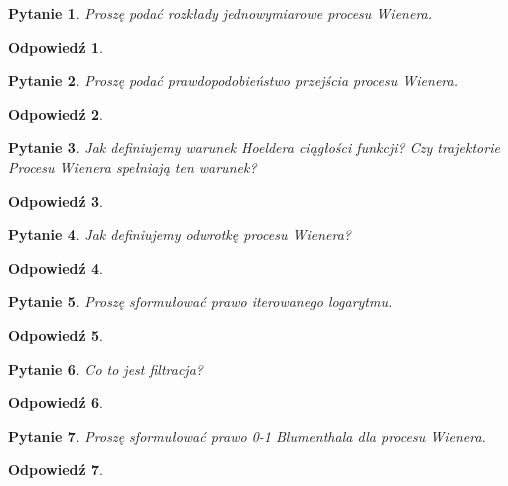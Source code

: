 \documentclass[12pt]{mwart}
\theoremstyle{plain}
\newtheorem{pytanie}{Pytanie}
\theoremstyle{break}
\newtheorem*{odpowiedź}{Odpowiedź}
\begin{document}
\begin{pytanie}
Proszę podać rozkłady jednowymiarowe procesu Wienera.
\end{pytanie}
\begin{odpowiedź}
\end{odpowiedź}


\begin{pytanie}
Proszę podać prawdopodobieństwo przejścia procesu Wienera.
\end{pytanie}
\begin{odpowiedź}
\end{odpowiedź}


\begin{pytanie}
Jak definiujemy warunek Hoeldera ciągłości funkcji? Czy trajektorie Procesu Wienera spełniają ten warunek?
\end{pytanie}
\begin{odpowiedź}
\end{odpowiedź}


\begin{pytanie}
Jak definiujemy odwrotkę procesu Wienera?
\end{pytanie}
\begin{odpowiedź}
\end{odpowiedź}


\begin{pytanie}
Proszę sformułować prawo iterowanego logarytmu.
\end{pytanie}
\begin{odpowiedź}
\end{odpowiedź}


\begin{pytanie}
Co to jest filtracja?
\end{pytanie}
\begin{odpowiedź}
\end{odpowiedź}


\begin{pytanie}
Proszę sformułować prawo 0-1 Blumenthala dla procesu Wienera.
\end{pytanie}
\begin{odpowiedź}
\end{odpowiedź}
\end{document}

